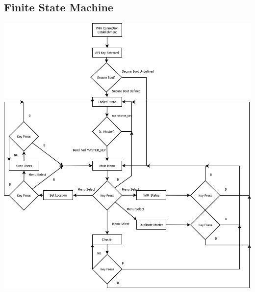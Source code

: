 \documentclass{article}
\begin{document}
\subsection{Finite State Machine}
\begin{center}\includegraphics[scale=0.25]{states}\end{center}
\end{document}
